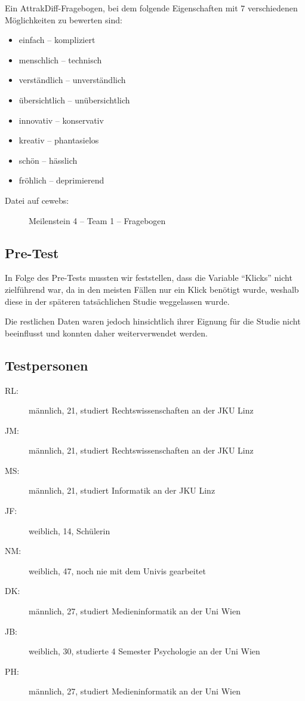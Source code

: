 \documentclass[a4paper,10pt]{scrartcl}
\begin{document}
Ein AttrakDiff-Fragebogen, bei dem folgende Eigenschaften mit 7 verschiedenen Möglichkeiten zu bewerten sind:

\begin{itemize}
\item einfach -- kompliziert 
\item menschlich -- technisch
\item verständlich -- unverständlich
\item übersichtlich -- unübersichtlich 
\item innovativ -- konservativ
\item kreativ -- phantasielos
\item schön -- hässlich
\item fröhlich -- deprimierend 
\end{itemize}

\begin{description}
 \item[Datei auf cewebs:] Meilenstein 4 -- Team 1 -- Fragebogen
\end{description}

\subsection{Pre-Test}

In Folge des Pre-Tests mussten wir feststellen, dass die Variable ``Klicks'' nicht zielführend war,
da in den meisten Fällen nur ein Klick benötigt wurde, weshalb diese in der späteren tatsächlichen Studie weggelassen wurde.

Die restlichen Daten waren jedoch hinsichtlich ihrer Eignung für die Studie nicht beeinflusst und konnten daher weiterverwendet werden.

\subsection{Testpersonen}

\begin{description}
 \item[RL:] männlich, 21, studiert Rechtswissenschaften an der JKU Linz
 \item[JM:] männlich, 21, studiert Rechtswissenschaften an der JKU Linz
 \item[MS:] männlich, 21, studiert Informatik an der JKU Linz
 \item[JF:] weiblich, 14, Schülerin
 \item[NM:] weiblich, 47, noch nie mit dem Univis gearbeitet
 \item[DK:] männlich, 27, studiert Medieninformatik an der Uni Wien
 \item[JB:] weiblich, 30, studierte 4 Semester Psychologie an der Uni Wien
 \item[PH:] männlich, 27, studiert Medieninformatik an der Uni Wien
\end{description}
\end{document}
